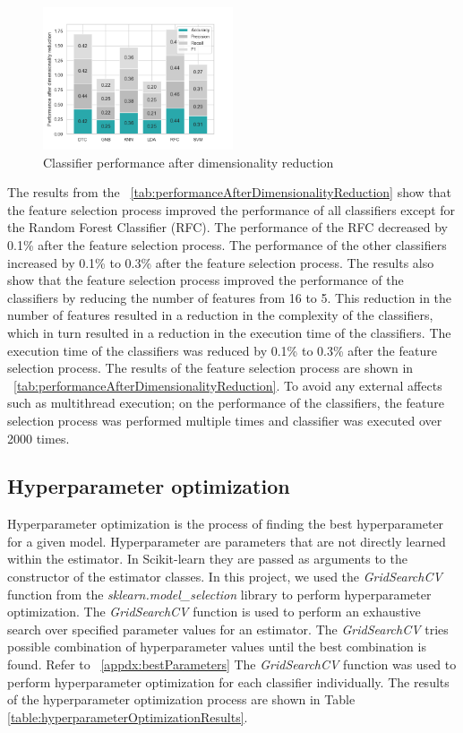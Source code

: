 \documentclass[conference,onecolumn]{IEEEtran}
\begin{document}
        \begin{figure}
            \centering
            \includegraphics[width=0.5\textwidth]{Plots/Performance_after_dimensionality_reduction.png}
            \caption{Classifier performance after dimensionality reduction}
            \label{fig:performanceAfterDimensionalityReduction}
        \end{figure}

        The results from the \tablename~\ref{tab:performanceAfterDimensionalityReduction} show that the feature selection process improved the performance of all classifiers except for the Random Forest Classifier (RFC). The performance of the RFC decreased by 0.1\% after the feature selection process. The performance of the other classifiers increased by 0.1\% to 0.3\% after the feature selection process. The results also show that the feature selection process improved the performance of the classifiers by reducing the number of features from 16 to 5. This reduction in the number of features resulted in a reduction in the complexity of the classifiers, which in turn resulted in a reduction in the execution time of the classifiers. The execution time of the classifiers was reduced by 0.1\% to 0.3\% after the feature selection process. The results of the feature selection process are shown in \tablename~\ref{tab:performanceAfterDimensionalityReduction}. To avoid any external affects such as multithread execution; on the performance of the classifiers, the feature selection process was performed multiple times and classifier was executed over 2000 times.
    \subsection{Hyperparameter optimization}
        Hyperparameter optimization is the process of finding the best hyperparameter for a given model. Hyperparameter are parameters that are not directly learned within the estimator. In Scikit-learn they are passed as arguments to the constructor of the estimator classes. In this project, we used the \emph{GridSearchCV} function from the \emph{sklearn.model\_selection} library to perform hyperparameter optimization. The \emph{GridSearchCV} function is used to perform an exhaustive search over specified parameter values for an estimator. The \emph{GridSearchCV} tries possible combination of hyperparameter values until the best combination is found. Refer to \appendixname~\ref{appdx:bestParameters} The \emph{GridSearchCV} function was used to perform hyperparameter optimization for each classifier individually. The results of the hyperparameter optimization process are shown in Table \ref{table:hyperparameterOptimizationResults}.
\end{document}
